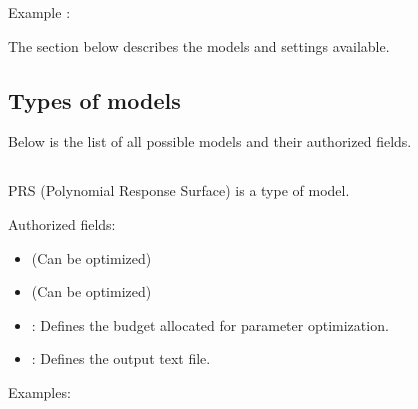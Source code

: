 \documentclass[letterpaper,10pt,english]{sphinxmanual}
\begin{document}
\sphinxAtStartPar
Example : 

\sphinxAtStartPar
The section below describes the models and settings available.


\subsection{Types of models}
\label{\detokenize{SgteLib:types-of-models}}
\sphinxAtStartPar
Below is the list of all possible models and their authorized fields.


\subsection{}
\label{\detokenize{SgteLib:prs}}\label{\detokenize{SgteLib:id1}}
\begin{DUlineblock}{0em}
\item[] PRS (Polynomial Response Surface) is a type of model.
\item[] Authorized fields:
\end{DUlineblock}
\begin{itemize}
\item {} 
\sphinxAtStartPar
{\hyperref[\detokenize{SgteLib:degree}]{}} (Can be optimized)

\item {} 
\sphinxAtStartPar
{\hyperref[\detokenize{SgteLib:ridge}]{}} (Can be optimized)

\item {} 
\sphinxAtStartPar
{\hyperref[\detokenize{SgteLib:budget}]{}}: Defines the budget allocated for parameter optimization.

\item {} 
\sphinxAtStartPar
{\hyperref[\detokenize{SgteLib:output}]{}}: Defines the output text file.

\end{itemize}

\begin{DUlineblock}{0em}
\item[] Examples:
\item[] 
\item[] 
\end{DUlineblock}
\end{document}
